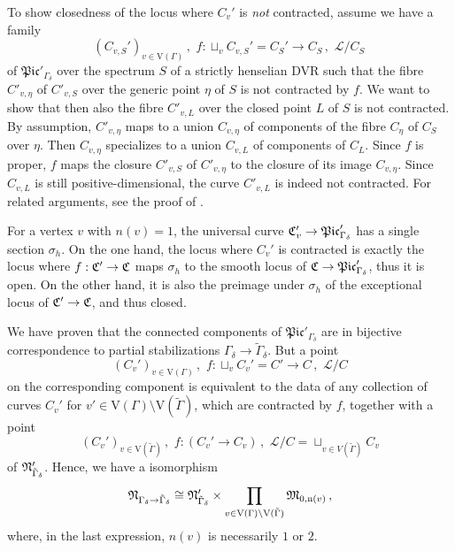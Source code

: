 \documentclass[a4paper,12pt]{article} %
\newcommand{\on}[1]{\operatorname{#1}}
\newcommand{\ca}[1]{{\mathcal{#1}}}
\def\n{\mathrm{n}}
\def\V{\mathrm{V}}
\theoremstyle{definition}
\theoremstyle{plain}%
\newcommand{\Picabs}{\mathfrak{Pic}}
\begin{document}
To show closedness of the locus where $C_v'$ is \emph{not} contracted, assume we have a family 
\[(C_{v,S}')_{v \in \V(\Gamma)}\, , \,\, f: \sqcup_v C_{v,S}' = C_S' \to C_S\, , \,\, \ca L/C_S\, \]
of $\Picabs'_{\Gamma_{\delta}}$ over the spectrum $S$ of a strictly henselian DVR such that the fibre $C'_{v,\eta}$ of $C'_{v,S}$ over the generic point $\eta$ of $S$ is not contracted by $f$. We want to show that then also the fibre $C'_{v,L}$ over the closed point $L$ of $S$ is not contracted. By assumption,  $C'_{v,\eta}$ maps to a union $C_{v,\eta}$ of components of the fibre $C_\eta$ of $C_S$ over $\eta$. Then $C_{v,\eta}$ specializes to a union $C_{v,L}$ of components of $C_L$. Since $f$ is proper, $f$ maps the closure $C'_{v,S}$ of $C'_{v,\eta}$ to the closure of its image $C_{v,\eta}$. Since $C_{v,L}$ is still positive-dimensional, the curve $C'_{v,L}$ is indeed not contracted. For related arguments, see the proof of \cite[Proposition 2.2]{Kresch2013Flattening-stra}. 


For a vertex $v$ with $n(v)=1$, the universal curve $\frak C_v' \to \Picabs'_{\Gamma_{\delta}}$ has a single section $\sigma_h$. On the one hand, the locus where $C_v'$ is contracted is exactly the locus where $f : \frak C' \to \frak C$ maps $\sigma_h$ to the smooth locus of $\frak C \to \Picabs'_{\Gamma_{\delta}}$, thus it is open. On the other hand, it is also the preimage under $\sigma_h$ of the exceptional locus of $\frak C' \to \frak C$, and thus closed.

We have proven that the connected components of $\Picabs'_{\Gamma_{\delta}}$ are in bijective correspondence to partial stabilizations $\Gamma_{\delta}\to\tilde{\Gamma}_{\delta}$. But a point 
\[(C_v')_{v \in \V(\Gamma)}\, , \,\, f: \sqcup_v C_v' = C' \to C\, , \,\, \ca L/C\]
on the corresponding component is equivalent to the data of any collection of curves $C_v'$ for $v' \in \V(\Gamma) \setminus \V(\tilde \Gamma)$, which are contracted by $f$, together with a point
\[(C_v')_{v \in \V(\tilde \Gamma)}\, , \,\, f: (C_v' \to C_v)\, , \,\, \ca L/C = \sqcup_{v \in V(\tilde \Gamma)} C_v\]
of $\frak N'_{\Tilde{\Gamma}_{\delta}}$. Hence, we have a isomorphism
\[\frak N_{\Gamma_{\delta}\to \tilde{\Gamma}_{\delta}} \cong \frak N'_{\Tilde{\Gamma}_{\delta}}\times \prod_{v\in \V(\Gamma)\setminus \V(\Tilde{\Gamma})} \frak M_{0,\n(v)}\, ,\]
where, in the last expression, $n(v)$ is necessarily $1$ or $2$.
\end{document}
